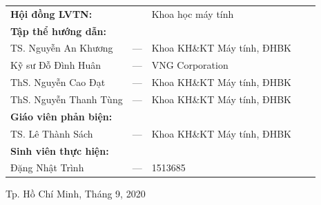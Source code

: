 \documentclass[a4paper,12pt]{report}
\begin{document}
\begin{titlepage}
\begin{center}
\begin{tabular}{c}
\end{tabular}
\end{center}

\vspace{1cm}

\begin{tabular}{lllll}
\hspace{1 cm} \textbf{Hội đồng LVTN:}& &Khoa học máy tính\\\addlinespace

\hspace{1 cm} \textbf{Tập thể hướng dẫn:}\\\addlinespace
\hspace{2 cm} TS. Nguyễn An Khương &---& Khoa KH\&KT Máy tính, ĐHBK  \\
\hspace{2 cm} Kỹ sư Đỗ Đình Huân &---& VNG Corporation \\
\hspace{2 cm} ThS. Nguyễn Cao Đạt &---& Khoa KH\&KT Máy tính, ĐHBK  \\
\hspace{2 cm} ThS. Nguyễn Thanh Tùng &---& Khoa KH\&KT Máy tính, ĐHBK  \\\addlinespace

\hspace{1 cm} \textbf{Giáo viên phản biện:}\\\addlinespace
\hspace{2 cm} TS. Lê Thành Sách &---& Khoa KH\&KT Máy tính, ĐHBK  \\\addlinespace

\hspace{1 cm} \textbf{Sinh viên thực hiện:} \\\addlinespace
\hspace{2 cm} Đặng Nhật Trình &---& 1513685

\end{tabular}

\vspace{1.5cm}

\begin{center}
{\footnotesize Tp. Hồ Chí Minh, Tháng 9, 2020}
\end{center}
\end{titlepage}

\preface


% 
% 
\end{document}
